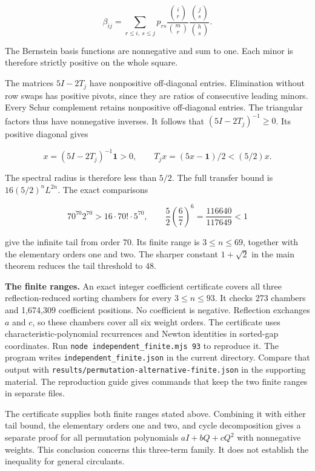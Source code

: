 \[
\beta_{ij}=\sum_{r\le i,\ s\le j}p_{rs}
\frac{\binom ir}{\binom mr}\frac{\binom js}{\binom hs}.
\]

The Bernstein basis functions are nonnegative and sum to one. Each minor is therefore strictly positive on the whole square.

The matrices \(5I-2T_j\) have nonpositive off-diagonal entries. Elimination without row swaps has positive pivots, since they are ratios of consecutive leading minors. Every Schur complement retains nonpositive off-diagonal entries. The triangular factors thus have nonnegative inverses. It follows that \((5I-2T_j)^{-1}\ge0\). Its positive diagonal gives

\[
x=(5I-2T_j)^{-1}\mathbf1>0,\qquad
T_jx=(5x-\mathbf1)/2<(5/2)x.
\]

The spectral radius is therefore less than \(5/2\). The full transfer bound is \(16(5/2)^nL^{2n}\). The exact comparisons

\[
70^{70}2^{70}>16\cdot70!\cdot5^{70},\qquad
\frac52\left(\frac67\right)^6=\frac{116640}{117649}<1
\]

give the infinite tail from order \(70\). Its finite range is \(3\le n\le69\), together with the elementary orders one and two. The sharper constant \(1+\sqrt2\) in the main theorem reduces the tail threshold to \(48\).

\textbf{The finite ranges.} An exact integer coefficient certificate covers all three reflection-reduced sorting chambers for every \(3\le n\le93\). It checks 273 chambers and 1,674,309 coefficient positions. No coefficient is negative. Reflection exchanges \(a\) and \(c\), so these chambers cover all six weight orders. The certificate uses characteristic-polynomial recurrences and Newton identities in sorted-gap coordinates. Run \texttt{node\ independent\_finite.mjs\ 93} to reproduce it. The program writes \nolinkurl{independent_finite.json} in the current directory. Compare that output with \nolinkurl{results/permutation-alternative-finite.json} in the supporting material. The reproduction guide gives commands that keep the two finite ranges in separate files.

The certificate supplies both finite ranges stated above. Combining it with either tail bound, the elementary orders one and two, and cycle decomposition gives a separate proof for all permutation polynomials \(aI+bQ+cQ^2\) with nonnegative weights. This conclusion concerns this three-term family. It does not establish the inequality for general circulants.
